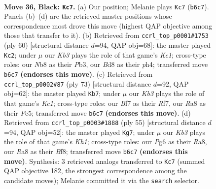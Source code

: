 \documentclass[11pt]{article}
\begin{document}
\clearpage

\begin{figure}[p]\centering
\begin{subfigure}{0.46\textwidth}\centering
\resizebox{\linewidth}{!}{%
\newchessgame
\chessboard[
  setfen={rn1b2r1/1p3b1p/1k4pP/p2pPp2/P7/1NN3P1/1B4K1/R2R4 b - - 16 36},
  showmover=false,
  pgfstyle=straightmove, color=movearrow, markmove={b6-c7}
]}
\caption{}
\end{subfigure}\hfill
\begin{subfigure}{0.46\textwidth}\centering
\resizebox{\linewidth}{!}{%
\newchessgame
\chessboard[
  setfen={2r4b/2r1pk1p/3pp2P/NB2n3/P3P1Pp/1PP2P2/3B4/2K2R2 w - - 1 31},
  showmover=false,
  pgfstyle=straightmove, color=movearrow, markmove={c1-c2}
]}
\caption{}
\end{subfigure}
\\[4pt]
\begin{subfigure}{0.46\textwidth}\centering
\resizebox{\linewidth}{!}{%
\newchessgame
\chessboard[
  setfen={2kbr1n1/2p2r2/p7/1pp1Pp2/7p/2N4P/PPP3PB/4RR1K b - - 7 37},
  showmover=false,
  pgfstyle=straightmove, color=movearrow, markmove={c8-b7}
]}
\caption{}
\end{subfigure}\hfill
\begin{subfigure}{0.46\textwidth}\centering
\resizebox{\linewidth}{!}{%
\newchessgame
\chessboard[
  setfen={r4b1k/1b1r4/p2p2pp/1p1Pp3/4N1PP/1P2B3/1P3PK1/2RR4 b - - 0 28},
  showmover=false,
  pgfstyle=straightmove, color=movearrow, markmove={h8-g7}
]}
\caption{}
\end{subfigure}
\caption{\textbf{Move 36, Black: \texttt{Kc7}.} (a) Our position; Melanie plays \texttt{Kc7} (\texttt{b6c7}). Panels (b)--(d) are the retrieved master positions whose correspondence most drove this move (highest QAP objective among those that transfer to it). (b) Retrieved from \texttt{ccrl\_top\_p0001\#1753} (ply 60) [structural distance $d$=94, QAP obj=68]: the master played \texttt{Kc2}; under $\mu$ our \emph{Kb3} plays the role of that game's \emph{Kc1}; cross-type roles: our \emph{N}b8 as their \emph{P}b3, our \emph{B}d8 as their \emph{p}h4; transferred move \texttt{b6c7} \textbf{(endorses this move)}. (c) Retrieved from \texttt{ccrl\_top\_p0002\#87} (ply 73) [structural distance $d$=92, QAP obj=62]: the master played \texttt{Kb7}; under $\mu$ our \emph{Kb3} plays the role of that game's \emph{Kc1}; cross-type roles: our \emph{B}f7 as their \emph{R}f7, our \emph{R}a8 as their \emph{P}c5; transferred move \texttt{b6c7} \textbf{(endorses this move)}. (d) Retrieved from \texttt{ccrl\_top\_p0003\#1888} (ply 55) [structural distance $d$=94, QAP obj=52]: the master played \texttt{Kg7}; under $\mu$ our \emph{Kb3} plays the role of that game's \emph{Kh1}; cross-type roles: our \emph{P}g6 as their \emph{R}a8, our \emph{R}a8 as their \emph{B}f8; transferred move \texttt{b6c7} \textbf{(endorses this move)}. Synthesis: 3 retrieved analogs transferred to \texttt{Kc7} (summed QAP objective 182, the strongest correspondence among the candidate moves); Melanie committed it via the \texttt{search} selector.}
\label{fig:thought-m71}
\end{figure}
\end{document}
